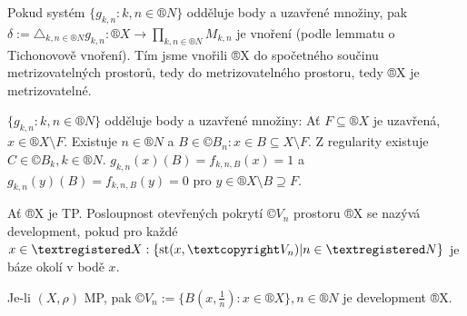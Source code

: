 \documentclass[12pt]{article}                   %
\begin{document}
\begin{veta}
\begin{dukazin}
            Pokud systém $\{g_{k, n}: k, n \in ®N\}$ odděluje body a uzavřené množiny, pak $\delta:= \triangle_{k, n \in ®N}g_{k, n}:®X \rightarrow \prod_{k, n \in ®N} M_{k, n}$ je vnoření (podle lemmatu o Tichonovově vnoření). Tím jsme vnořili ®X do spočetného součinu metrizovatelných prostorů, tedy do metrizovatelného prostoru, tedy ®X je metrizovatelné.

            $\{g_{k, n}: k, n \in ®N\}$ odděluje body a uzavřené množiny: Ať $F \subseteq ®X$ je uzavřená, $x \in ®X\setminus F$. Existuje $n \in ®N$ a $B \in ©B_n: x \in B \subseteq X \setminus F$. Z regularity existuje $C \in ©B_k, k \in ®N$. $g_{k, n}(x)(B) = f_{k, n, B}(x) = 1$ a $g_{k, n}(y)(B) = f_{k, n, B}(y) = 0$ pro $y \in ®X \setminus B \supseteq F$.
        \end{dukazin}
    \end{veta}

    \begin{definice}
        Ať ®X je TP. Posloupnost otevřených pokrytí $©V_n$ prostoru ®X se nazývá development, pokud pro každé $x \in ®X: \{\st(x, ©V_n)| n \in ®N\}$ je báze okolí v bodě $x$.
    \end{definice}

    \begin{poznamka}
        Je-li $(X, \rho)$ MP, pak $©V_n:= \{B(x, \frac{1}{n}): x \in ®X\}, n \in ®N$ je development ®X.
    \end{poznamka}
\end{document}
